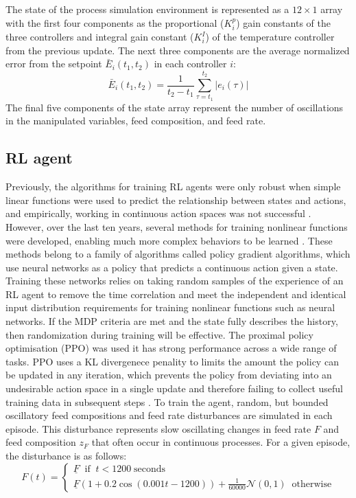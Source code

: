 The state of the process simulation environment is represented as a $12\times 1$ array with the first four components as the proportional ($K_i^p$) gain constants of the three controllers and integral gain constant ($K_i^I$) of the temperature controller from the previous update. The next three components are the average normalized error from the setpoint $\bar E_i(t_1,t_2)$ in each controller $i$:
\begin{equation}
	\bar E_i(t_1, t_2) =\frac{1}{t_2-t_1}\sum_{\tau=t_1}^{t_2} \lvert e_i(\tau) \rvert
\end{equation}
The final five components of the state array represent the number of oscillations in the manipulated variables, feed composition, and feed rate. 

\subsection{RL agent}
Previously, the algorithms for training RL agents were only robust when simple linear functions were used to predict the relationship between states and actions, and empirically, working in continuous action spaces was not successful \cite{Sutton2018}. However, over the last ten years, several methods for training nonlinear functions were developed, enabling much more complex behaviors to be learned \cite{Mnih2013, Lillicrap2016}. These methods belong to a family of algorithms called policy gradient algorithms, which use neural networks as a policy that predicts a continuous action given a state. Training these networks relies on taking random samples of the experience of an RL agent to remove the time correlation and meet the independent and identical input distribution requirements for training nonlinear functions such as neural networks. If the MDP criteria are met and the state fully describes the history, then randomization during training will be effective. The proximal policy optimisation (PPO) was used \cite{Schulman2017} it has strong performance across a wide range of tasks. PPO uses a KL divergenece penality to limits the amount the policy can be updated in any iteration, which prevents the policy from deviating into an undesirable action space in a single update and therefore failing to collect useful training data in subsequent steps \cite{Schulman2017, Engstrom2020}. To train the agent, random, but bounded oscillatory feed compositions and feed rate disturbances are simulated in each episode. This disturbance represents slow oscillating changes in feed rate $F$ and feed composition $z_F$ that often occur in continuous processes. For a given episode, the disturbance is as follows:
\begin{equation}
	F(t) = 
	\begin{cases}
		\underline F \;\; \text{if}\;\; t < 1200 \;\text{seconds} \\
		\underline F(1+ 0.2\cos(0.001t-1200))+\frac{1}{60000} \mathcal{N}(0,1) \;\; \text{otherwise}
	\end{cases}
\end{equation}

